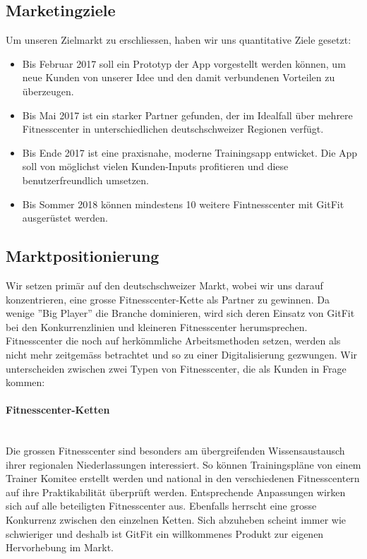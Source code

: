 \subsection{Marketingziele}
Um unseren Zielmarkt zu erschliessen, haben wir uns quantitative Ziele gesetzt:
\begin{itemize}
	\item Bis Februar 2017 soll ein Prototyp der App vorgestellt werden können, um neue Kunden von unserer Idee und den damit verbundenen Vorteilen zu überzeugen.
	\item Bis Mai 2017 ist ein starker Partner gefunden, der im Idealfall über mehrere Fitnesscenter in unterschiedlichen deutschschweizer Regionen verfügt.
	\item Bis Ende 2017 ist eine praxisnahe, moderne Trainingsapp entwicket. Die App soll von möglichst vielen Kunden-Inputs profitieren und diese benutzerfreundlich umsetzen.
	\item Bis Sommer 2018 können mindestens 10 weitere Fintnesscenter mit GitFit ausgerüstet werden.
\end{itemize}

\subsection{Marktpositionierung}
Wir setzen primär auf den deutschschweizer Markt, wobei wir uns darauf konzentrieren, eine grosse Fitnesscenter-Kette als Partner zu gewinnen. Da wenige ''Big Player'' die Branche dominieren, wird sich deren Einsatz von GitFit bei den Konkurrenzlinien und kleineren Fitnesscenter herumsprechen. Fitnesscenter die noch auf herkömmliche Arbeitsmethoden setzen, werden als nicht mehr zeitgemäss betrachtet und so zu einer Digitalisierung gezwungen. Wir unterscheiden zwischen zwei Typen von Fitnesscenter, die als Kunden in Frage kommen:

\paragraph{Fitnesscenter-Ketten} \hfill \\
Die grossen Fitnesscenter sind besonders am übergreifenden Wissensaustausch ihrer regionalen Niederlassungen interessiert. So können Trainingspläne von einem Trainer Komitee erstellt werden und national in den verschiedenen Fitnesscentern auf ihre Praktikabilität überprüft werden. Entsprechende Anpassungen wirken sich auf alle beteiligten Fitnesscenter aus. Ebenfalls herrscht eine grosse Konkurrenz zwischen den einzelnen Ketten. Sich abzuheben scheint immer wie schwieriger und deshalb ist GitFit ein willkommenes Produkt zur eigenen Hervorhebung im Markt. 

